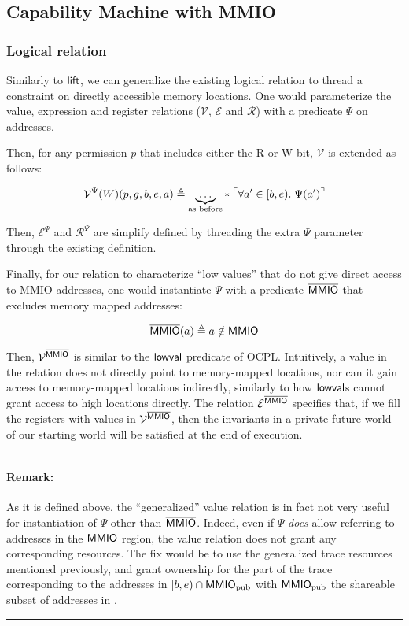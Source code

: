\documentclass{article}
\newcommand{\X}[1]{\ensuremath{\mathrm{#1}}}
\newcommand{\pure}[1]{\tensor[^{\ulcorner}]{#1{}}{^{\urcorner}}} %
\newcommand{\MMIO}{\textlog{MMIO}\xspace}
\newenvironment{remark}
{ \bigskip\hrule\vspace{-1.3em}\nobreak
  \paragraph*{Remark:}}
{\vspace*{0.5em}\hrule\medskip}
\begin{document}
\subsection{Capability Machine with MMIO}

\subsubsection{Logical relation}

\newcommand{\VR}{\mathcal{V}}
\newcommand{\ER}{\mathcal{E}}
\newcommand{\RR}{\mathcal{R}}
\newcommand{\notMMIO}{\overline{\MMIO}}

Similarly to $\textsf{lift}$, we can generalize the existing logical relation
to thread a constraint on directly accessible memory locations. One would
parameterize the value, expression and register relations ($\VR$, $\ER$ and $\RR$)
with a predicate $\Psi$ on addresses.

Then, for any permission $p$ that includes either the R or W bit, $\VR$
is extended as follows:

\[
  \VR^{\Psi}(W)(p, g, b, e, a) \eqdef \underbrace{\ldots}_{\text{as before}} \ast \; \pure{\forall a' \in [b,e).\; \Psi(a')}
\]

Then, $\ER^{\Psi}$ and $\RR^{\Psi}$ are simplify defined by threading the extra
$\Psi$ parameter through the existing definition.

Finally, for our relation to characterize ``low values'' that do not give direct
access to MMIO addresses, one would instantiate $\Psi$ with a predicate
$\notMMIO$ that excludes memory mapped addresses:

\[
  \notMMIO(a) \eqdef a \notin \MMIO
\]

Then, $\VR^{\notMMIO}$ is similar to the $\textsf{lowval}$ predicate of OCPL.
Intuitively, a value in the relation does not directly point to memory-mapped
locations, nor can it gain access to memory-mapped locations indirectly,
similarly to how $\textsf{lowval}$s cannot grant access to high locations
directly. The relation $\ER^{\notMMIO}$ specifies that, if we fill the registers
with values in $\VR^{\notMMIO}$, then the invariants in a private future world
of our starting world will be satisfied at the end of execution.

\begin{remark} As it is defined above, the ``generalized'' value relation
is in fact not very useful for instantiation of $\Psi$ other than $\notMMIO$.
Indeed, even if $\Psi$ \emph{does} allow referring to addresses in the $\MMIO$
region, the value relation does not grant any corresponding resources. The fix
would be to use the generalized trace resources mentioned previously, and grant
ownership for the part of the trace corresponding to the addresses in
$[b,e) \cap \MMIO_{\X{pub}}$ with $\MMIO_{\X{pub}}$ the shareable subset of
addresses in \MMIO.
\end{remark}
\end{document}
